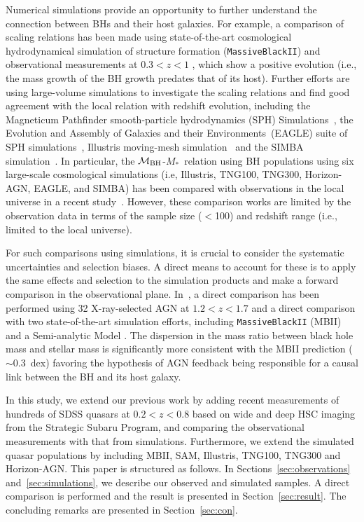 \documentclass[twocolumn]{aastex631}
\def\smass{{$M_*$}}
\def\mbh{$\mathcal M_{\rm BH}$}
\begin{document}
Numerical simulations provide an opportunity to further understand the connection between BHs and their host galaxies. For example, a comparison of scaling relations has been made using state-of-the-art cosmological hydrodynamical simulation of structure formation ({\tt MassiveBlackII}) and observational measurements at  $0.3<z<1$ \citep[e.g., ][]{DeG++15}, which show a positive evolution (i.e., the mass growth of the BH growth predates that of its host). Further efforts are using large-volume simulations to investigate the scaling relations and find good agreement with the local relation with redshift evolution, 
including the Magneticum Pathfinder smooth-particle hydrodynamics (SPH) Simulations~\citep{Steinborn2015}, the Evolution and Assembly of Galaxies and their Environments~(EAGLE) suite of SPH simulations~\citep{Schaye2015}, Illustris moving-mesh simulation~\citep{Sijacki2015, 2014MNRAS.444.1518V, Li2019} and the SIMBA simulation~\citep{Thomas2019}. 
In particular, the \mbh-\smass\ relation using BH populations using six large-scale cosmological simulations (i.e, Illustris, TNG100, TNG300, Horizon-AGN, EAGLE, and SIMBA) has been compared with observations in the local universe in a recent study~\citep{Habouzit2021}. However, these comparison works are limited by the observation data in terms of the sample size ($<$100) and redshift range (i.e., limited to the local universe).

For such comparisons using simulations, it is crucial to consider the systematic uncertainties and selection biases. A direct means to account for these is to apply the same effects and selection to the simulation products and make a forward comparison in the observational plane. In~\citet{Ding2020b}, a direct comparison has been performed using 32 X-ray-selected AGN at $1.2<z<1.7$ and a direct comparison with two state-of-the-art simulation efforts, including {\tt MassiveBlackII} (MBII) and a Semi-analytic Model \citep[SAM,][]{Menci2014, Menci2016}. The dispersion in the mass ratio between black hole mass and stellar mass is significantly more consistent with the MBII prediction ($\sim0.3$~dex) favoring the hypothesis of AGN feedback being responsible for a causal link between the BH and its host galaxy.

In this study, we extend our previous work by adding recent measurements of hundreds of SDSS quasars at $0.2<z<0.8$ based on wide and deep HSC imaging from the Strategic Subaru Program, and comparing the observational measurements with that from simulations. Furthermore, we extend the simulated quasar populations by including MBII, SAM, Illustris, TNG100, TNG300 and Horizon-AGN. This paper is structured as follows. In Sections~\ref{sec:observations} and~\ref{sec:simulations}, we describe our observed and simulated samples. A direct comparison is performed and the result is presented in Section~\ref{sec:result}. The concluding remarks are presented in Section~\ref{sec:con}.
\end{document}
